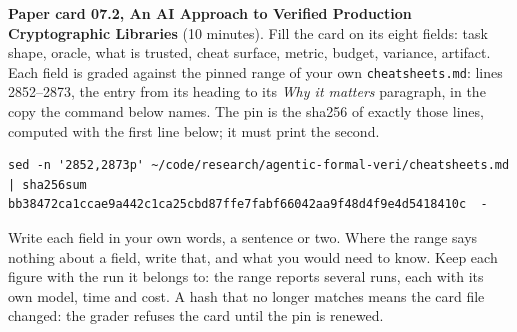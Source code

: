 \documentclass[11pt]{article}
\begin{document}
\begin{problem}\label{prob:B4}
\textbf{Paper card 07.2, An AI Approach to Verified Production Cryptographic
Libraries} (10 minutes). Fill the card on its eight fields: task shape, oracle,
what is trusted, cheat surface, metric, budget, variance, artifact. Each field
is graded against the pinned range of your own \texttt{cheatsheets.md}: lines
2852--2873, the entry from its heading to its \emph{Why it matters} paragraph,
in the copy the command below names. The pin is the sha256 of exactly those
lines, computed with the first line below; it must print the second.
{\small
\begin{verbatim}
sed -n '2852,2873p' ~/code/research/agentic-formal-veri/cheatsheets.md | sha256sum
bb38472ca1ccae9a442c1ca25cbd87ffe7fabf66042aa9f48d4f9e4d5418410c  -
\end{verbatim}
}
Write each field in your own words, a sentence or two. Where the range says
nothing about a field, write that, and what you would need to know. Keep each
figure with the run it belongs to: the range reports several runs, each with
its own model, time and cost. A hash that no longer matches means the card file
changed: the grader refuses the card until the pin is renewed.
\end{problem}
\end{document}
